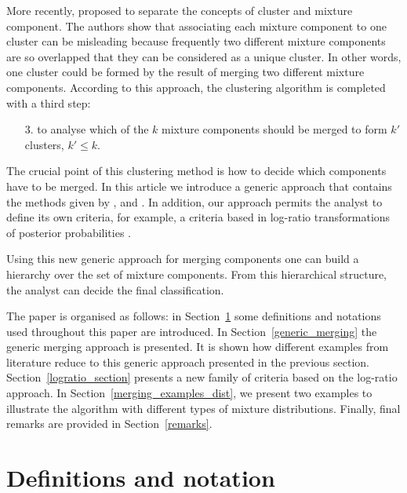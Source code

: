 \documentclass[submit]{smj}
\theoremstyle{definition}
\begin{document}
More recently, \cite{lee2004combining,hennig2010methods,baudry2010combining,melnykov2013distribution,pastore2013merging} proposed to separate the concepts of cluster and mixture component. The authors show that associating each mixture component to one cluster can be misleading because frequently two different mixture components are so overlapped that they can be considered as a unique cluster. In other words, one cluster could be formed by the result of merging two different mixture components. According to this approach, the clustering algorithm is completed with a third step:

\begin{itemize}
\item[3.] to analyse which of the $k$ mixture components should be merged to form $k'$ clusters, $k' \leq k$.
\end{itemize}

The crucial point of this clustering method is how to decide which components have to be merged. In this article we introduce a generic approach that contains the methods given by \cite{baudry2010combining}, \cite{hennig2010methods} and \cite{longford2014}. In addition, our approach permits the analyst  to define its own criteria, for example, a criteria based in log-ratio transformations of posterior probabilities \citep{aitchison1986statistical}.

Using this new generic approach for merging components one can build a hierarchy over the set of mixture components. From this hierarchical structure, the analyst can decide the final classification.

The paper is organised as follows: in Section~\ref{definitions} some definitions and notations used throughout this paper are introduced. In Section~\ref{generic_merging} the generic merging approach is presented. It is shown how different examples from literature reduce to this generic approach presented in the previous section. Section~\ref{logratio_section} presents a new family of criteria based on the log-ratio approach. In Section~\ref{merging_examples_dist}, we present two examples to illustrate the algorithm with different types of mixture distributions. Finally, final remarks are provided in Section~\ref{remarks}.

\section{Definitions and notation}\label{definitions}
\end{document}

